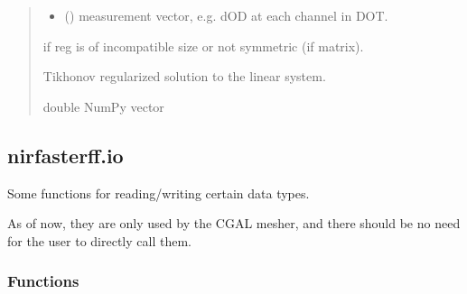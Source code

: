 \documentclass[letterpaper,10pt,english]{sphinxmanual}
\begin{document}
\begin{fulllineitems}
\begin{quote}
\begin{description}
\begin{itemize}
\item {} 
\sphinxAtStartPar
{} () \textendash{} measurement vector, e.g. dOD at each channel in DOT.

\end{itemize}

\sphinxAtStartPar
{} \textendash{} if reg is of incompatible size or not symmetric (if matrix).

\sphinxAtStartPar
{} \textendash{} Tikhonov regularized solution to the linear system.

\sphinxAtStartPar
double NumPy vector

\end{description}\end{quote}

\end{fulllineitems}


\sphinxstepscope


\subsection{nirfasterff.io}
\label{\detokenize{_autosummary/nirfasterff.io:module-nirfasterff.io}}\label{\detokenize{_autosummary/nirfasterff.io:nirfasterff-io}}\label{\detokenize{_autosummary/nirfasterff.io::doc}}
\sphinxAtStartPar
Some functions for reading/writing certain data types.

\sphinxAtStartPar
As of now, they are only used by the CGAL mesher, and there should be no need for the user to directly call them.
\subsubsection*{Functions}
\end{document}
